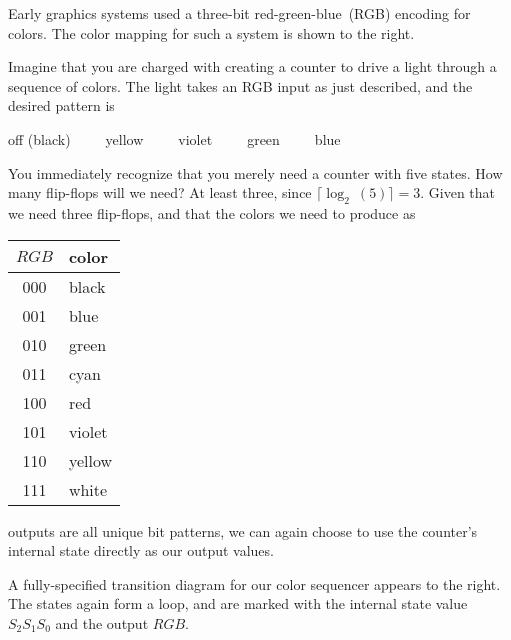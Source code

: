 \begin{minipage}{4.75in}
Early graphics systems used a three-bit red-green-blue~(RGB) 
encoding for colors.  The color mapping for such a system is shown to
the right.\mpline

Imagine that you are charged with creating a counter to drive a light
through a sequence of colors.  The light takes an RGB input as just
described, and the desired pattern is\mpline

\centerline{off (black)~~~~~yellow~~~~~violet~~~~~green~~~~~blue}\vspace{6pt}

You immediately recognize that you merely need a counter with five
states.  How many flip-flops will we need?  At least three, since
$\lceil\log_2~(5)\rceil=3$.  Given that we need three flip-flops, 
and that the colors we need to produce as\linebreak
\end{minipage}\hspace{.25in}%
\begin{minipage}{1.5in}
\begin{tabular}{c|l}
$RGB$& color\\ \hline
000& black\\
001& blue\\
010& green\\
011& cyan\\
100& red\\
101& violet\\
110& yellow\\
111& white
\end{tabular}\vspace{12pt}
\end{minipage}\mpdone

outputs are all unique
bit patterns, we can again choose to use the counter's internal 
state directly as our output values.

\begin{minipage}{2.6in}
A fully-specified transition diagram for our color sequencer
appears to the right.  The states again form a loop,
and are marked with the internal state value~$S_2S_1S_0$ 
and the output $RGB$.
\end{minipage}\hspace{.25in}%
\begin{minipage}{3.65in}
\end{minipage}

